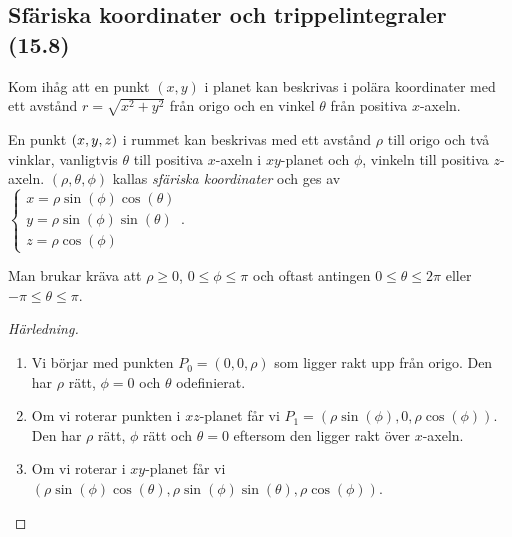 \documentclass[a4paper]{article}
\begin{document}
\providecommand\fname{}
\renewcommand\fname{19-10-03}

\subsection{Sfäriska koordinater och trippelintegraler (15.8)}
Kom ihåg att en punkt \(
    (x,y)
\) i planet kan beskrivas i polära koordinater med ett avstånd \(
    r = \sqrt{x^2+y^2}
\) från origo och en vinkel \(
    \theta 
\) från positiva \(
    x
\)-axeln. 

\begin{defn}
    En punkt \(
        (x,y,z)
    \) i rummet kan beskrivas med ett avstånd \(
        \rho
    \) till origo och två vinklar, vanligtvis \(
        \theta
    \) till positiva \(
        x
    \)-axeln i \(
        xy
    \)-planet och \(
        \phi
    \), vinkeln till positiva \(
        z
    \)-axeln. \(
        (\rho, \theta, \phi)
    \) kallas \emph{sfäriska koordinater} och ges av \(
        \left\{\begin{matrix}
            x = \rho \sin(\phi)\cos(\theta) \\
            y = \rho \sin(\phi)\sin(\theta) \\
            z = \rho \cos(\phi)
        \end{matrix}\right.
    \). 
    
    Man brukar kräva att \(
        \rho \geq 0
    \), \(
        0 \leq \phi \leq \pi
    \) och oftast antingen \(
        0 \leq \theta \leq 2\pi
    \) eller \(
        -\pi \leq \theta \leq \pi
    \).

    \begin{proof}[Härledning]
        ~\\
        \begin{enumerate}
            \item Vi börjar med punkten \(
                P_0 = (0,0,\rho)
            \) som ligger rakt upp från origo. Den har \(
                \rho 
            \) rätt, \(
                \phi = 0
            \) och \(
                \theta
            \) odefinierat.

            \item Om vi roterar punkten i \(
                xz
            \)-planet får vi \(
                P_1 = (\rho \sin(\phi), 0, \rho \cos(\phi))
            \). Den har \(
                \rho 
            \) rätt, \(
                \phi
            \) rätt och \(
                \theta = 0
            \) eftersom den ligger rakt över \(
                x
            \)-axeln.

            \item Om vi roterar i \(
                xy
            \)-planet får vi \(
                (\rho \sin(\phi)\cos(\theta), \rho \sin(\phi)\sin(\theta), \rho \cos(\phi))
            \).
        \end{enumerate}
    \end{proof}
\end{defn}
\end{document}
